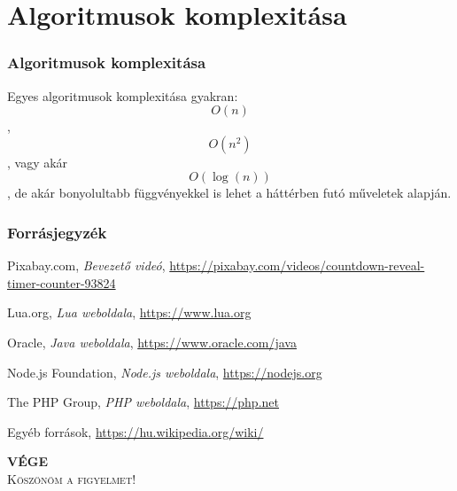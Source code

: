 \documentclass[10pt]{beamer}
\begin{document}
	\transdissolve
	\section{Algoritmusok komplexitása}
	\begin{frame}
		\frametitle{Algoritmusok komplexitása}
		
		Egyes algoritmusok komplexitása gyakran:\\
		\[O(n)\], \[O(n^2)\], vagy akár \[O(\log(n))\], de akár bonyolultabb függvényekkel is lehet a háttérben futó műveletek alapján.
	\end{frame}

	\begin{frame}
		\frametitle{Forrásjegyzék}

		\begin{thebibliography}{9}
			 Pixabay.com, \emph{Bevezető videó},
				\url{https://pixabay.com/videos/countdown-reveal-timer-counter-93824}		
		
			 Lua.org, \emph{Lua weboldala},
				\url{https://www.lua.org}

			 Oracle, \emph{Java weboldala},
				\url{https://www.oracle.com/java}

			 Node.js Foundation, \emph{Node.js weboldala},
				\url{https://nodejs.org}
				
			 The PHP Group, \emph{PHP weboldala},
				\url{https://php.net}
				
			 Egyéb források,
				\url{https://hu.wikipedia.org/wiki/}
		\end{thebibliography}
	\end{frame}
	
	\begin{frame}
		\begin{center}
			\textbf{\huge{VÉGE}} \\
			\textsc{ \large{ Köszönöm a figyelmet! } }
		\end{center}
	\end{frame}
\end{document}
